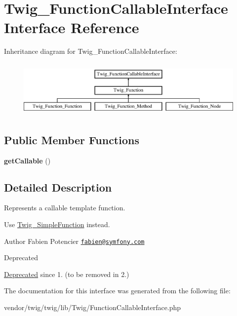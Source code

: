 \hypertarget{interfaceTwig__FunctionCallableInterface}{}\section{Twig\+\_\+\+Function\+Callable\+Interface Interface Reference}
\label{interfaceTwig__FunctionCallableInterface}
Inheritance diagram for Twig\+\_\+\+Function\+Callable\+Interface\+:\begin{figure}[H]
\begin{center}
\leavevmode
\includegraphics[height=2.828283cm]{interfaceTwig__FunctionCallableInterface}
\end{center}
\end{figure}
\subsection*{Public Member Functions}
\begin{DoxyCompactItemize}
\item 
{\bfseries get\+Callable} ()\hypertarget{interfaceTwig__FunctionCallableInterface_a43c758445ec20e5b335257c5609ce178}{}\label{interfaceTwig__FunctionCallableInterface_a43c758445ec20e5b335257c5609ce178}

\end{DoxyCompactItemize}


\subsection{Detailed Description}
Represents a callable template function.

Use \hyperlink{classTwig__SimpleFunction}{Twig\+\_\+\+Simple\+Function} instead.

\begin{DoxyAuthor}{Author}
Fabien Potencier \href{mailto:fabien@symfony.com}{\tt fabien@symfony.\+com}
\end{DoxyAuthor}
\begin{DoxyRefDesc}{Deprecated}
\item[\hyperlink{deprecated__deprecated000027}{Deprecated}]since 1. (to be removed in 2.) \end{DoxyRefDesc}


The documentation for this interface was generated from the following file\+:\begin{DoxyCompactItemize}
\item 
vendor/twig/twig/lib/\+Twig/Function\+Callable\+Interface.\+php\end{DoxyCompactItemize}
